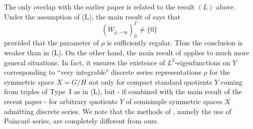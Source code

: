 \documentclass[10]{amsart}
\theoremstyle{remark}
\theoremstyle{definition}
\numberwithin{equation}{section}
\begin{document}
The only overlap with the earlier paper \cite{KK2} is related to the result $(L)$ above. Under the assumption of (L), the main result of  \cite{KK2} says that 
$$ (W_{\widetilde{\rho},-\infty})^\Gamma_0\ne \{0\} $$
provided that the parameter of $\rho$ is sufficiently regular. Thus the conclusion is weaker than in (L). On the other hand, the main result of \cite{KK2} applies to much more general situations. In fact, it ensures the existence of $L^2$-eigenfunctions on $Y$ corresponding to ``very  integrable" discrete series representations
$\rho$ for the symmetric space $X=G/H$
not only for compact standard quotients $Y$ coming from triples of Type~I as in (L), but - if combined with the main result of the recent paper \cite{KT24} - for arbitrary quotients $Y$ of semisimple symmetric spaces $X$ admitting discrete series. We note that the methods of \cite{KK2}, namely the use of Poincar\'e series, are completely different from ours.
\end{document}
